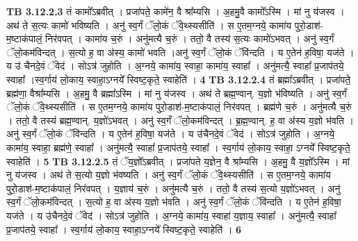 \documentclass[17pt]{extarticle}
\begin{document}
{{{{{{{{{{{{{{{{{{{{{{{                  \newline
                                \textbf{ TB 3.12.2.3} \newline
                  तं कामो᳚ऽब्रवीत् । प्रजा॑पते॒ कामे॑न॒ वै श्रा᳚म्यसि । अ॒हमु॒वै कामो᳚ऽस्मि । मां नु य॑जस्व । अथ॑ ते स॒त्यः कामो॑ भविष्यति । अनु॑ स्व॒र्गं ॅलो॒कं ॅवे॒थ्स्यसीति॑ । स ए॒तम॒ग्नये॒ कामा॑य पुरो॒डाश॑-म॒ष्टाक॑पालं॒ निर॑वपत् । कामा॑य च॒रुं । अनु॑मत्यै च॒रुं । ततो॒ वै तस्य॑ स॒त्यः कामो॑ऽभवत् । अनु॑ स्व॒र्गं ॅलो॒कम॑विन्दत् । स॒त्यो ह॒ वा अ॑स्य॒ कामो॑ भवति ।अनु॑ स्व॒र्गं ॅलो॒कं ॅवि॑न्दति । य ए॒तेन॑ ह॒विषा॒ यज॑ते ।य उ॑ चैनदे॒वं ॅवेद॑ । सोऽत्र॑ जुहोति । अ॒ग्नये॒ कामा॑य॒ स्वाहा॒ कामा॑य॒ स्वाहा᳚ । अनु॑मत्यै॒ स्वाहा᳚ प्र॒जाप॑तये॒ स्वाहा᳚ ।स्व॒र्गाय॑ लो॒काय॒ स्वाहा॒ऽग्नये᳚ स्विष्ट॒कृते॒ स्वाहेति॑ । \textbf{ 4} \newline
                  \newline
                                \textbf{ TB 3.12.2.4} \newline
                  तं ब्रह्मा᳚ऽब्रवीत् । प्रजा॑पते॒ ब्रह्म॑णा॒ वैश्रा᳚म्यसि । अ॒हमु॒ वै ब्रह्मा᳚ऽस्मि । मां नु य॑जस्व । अथ॑ ते ब्रह्म॒ण्वान्. य॒ज्ञो भ॑विष्यति । अनु॑ स्व॒र्गं ॅलो॒कं ॅवे॒थ्स्यसीति॑ । स ए॒तम॒ग्नये॒ कामा॑य पुरो॒डाश॑-म॒ष्टाक॑पालं॒ निर॑वपत् । ब्रह्म॑णे च॒रुं । अनु॑मत्यै च॒रुं । ततो॒ वै तस्य॑ ब्रह्म॒ण्वान्. य॒ज्ञो॑ऽभवत् । अनु॑ स्व॒र्गं ॅलो॒कम॑विन्दत् । ब्र॒ह्म॒ण्वान्. ह॒ वा अ॑स्य य॒ज्ञो भ॑वति । अनु॑ स्व॒र्गं ॅलो॒कं ॅवि॑न्दति । य ए॒तेन॑ ह॒विषा॒ यज॑ते । य उ॑चैनदे॒वं ॅवेद॑ । सोऽत्र॑ जुहोति । अ॒ग्नये॒ कामा॑य॒ स्वाहा॒ ब्रह्म॑णे॒ स्वाहा᳚ । अनु॑मत्यै॒ स्वाहा᳚ प्र॒जाप॑तये॒ स्वाहा᳚ । स्व॒र्गाय॑ लो॒काय॒ स्वाहा॒ ऽग्नये᳚ स्विष्ट॒कृते॒ स्वाहेति॑ । \textbf{ 5} \newline
                  \newline
                                \textbf{ TB 3.12.2.5} \newline
                  तं ॅय॒ज्ञो᳚ऽब्रवीत् । प्रजा॑पते य॒ज्ञेन॒ वै श्रा᳚म्यसि । अ॒हमु॒ वै य॒ज्ञो᳚ऽस्मि । मां नु य॑जस्व । अथ॑ ते स॒त्यो य॒ज्ञो भ॑वष्यति । अनु॑ स्व॒र्गं ॅलो॒कं ॅवे॒थ्स्यसीति॑ । स ए॒तम॒ग्नये॒ कामा॑य पुरो॒डाश॑-म॒ष्टाक॑पालं॒ निर॑वपत् । य॒ज्ञाय॑ च॒रुं । अनु॑मत्यै च॒रुं । ततो॒ वै तस्य॑ स॒त्यो य॒ज्ञो॑ऽभवत् । अनु॑ स्व॒र्गं ॅलो॒कम॑विन्दत् । स॒त्यो ह॒ वा अ॑स्य य॒ज्ञो भ॑वति । अनु॑ स्व॒र्गं ॅलो॒कं ॅवि॑न्दति । य ए॒तेन॑ ह॒विषा॒ यज॑ते । य उ॑चैनदे॒वं ॅवेद॑ । सोऽत्र॑ जुहोति । अ॒ग्नये॒ कामा॑य॒ स्वाहा॑ य॒ज्ञाय॒ स्वाहा᳚ । अनु॑मत्यै॒ स्वाहा᳚ प्र॒जाप॑तये॒ स्वाहा᳚ । स्व॒र्गाय॑ लो॒काय॒ स्वाहा॒ऽग्नये᳚ स्विष्ट॒कृते॒ स्वाहेति॑ । \textbf{ 6} \newline
                  \newline
}}}}}}}}}}}}}}}}}}}}}}}
\end{document}
